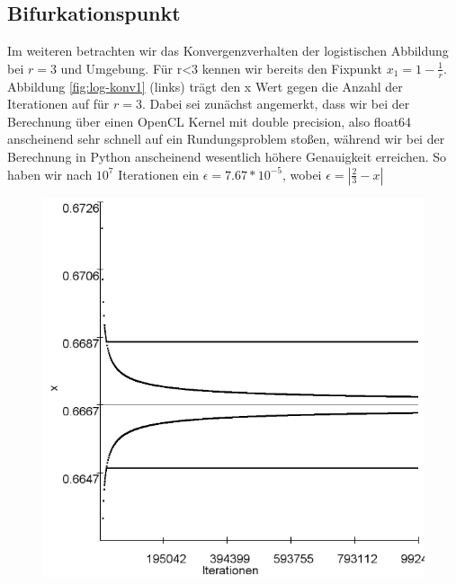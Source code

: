 \documentclass{scrartcl}
\begin{document}
\subsection{Bifurkationspunkt}
Im weiteren betrachten wir das Konvergenzverhalten der logistischen Abbildung bei $r=3$ und Umgebung. Für r<3 kennen wir bereits den Fixpunkt $x_1=1-\frac{1}{r}$. 
Abbildung \ref{fig:log-konv1} (links) trägt den x Wert gegen die Anzahl der Iterationen auf für $r=3$. Dabei sei zunächst angemerkt, dass wir bei der Berechnung über einen OpenCL Kernel mit double precision, also float64 anscheinend sehr schnell auf ein Rundungsproblem stoßen, während wir bei der Berechnung in Python anscheinend wesentlich höhere Genauigkeit erreichen. So haben wir nach $10^7$ Iterationen ein $\epsilon=7.67*10^{-5}$, wobei $\epsilon=|\frac{2}{3}-x|$
\begin{figure}
\centering
\includegraphics[scale=0.3]{log-konv-r3}

\end{figure}
\end{document}
